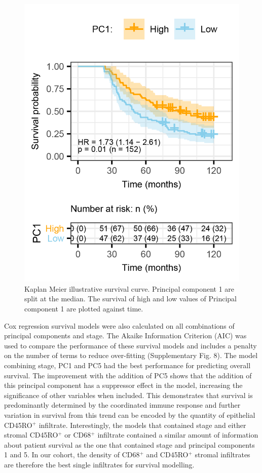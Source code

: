 \begin{figure}
    \centering
    \includegraphics{Chapter2/Figs/Raster/Montfort-2018_Fig7A-PC1.png}
    \caption[Kaplan Meier Curves for Principal Component 1]{Kaplan Meier illustrative survival curve. Principal component 1 are split at the median. The survival of high and low values of Principal component 1 are plotted against time. }
    \label{fig:km_PC}
\end{figure}
Cox regression survival models were also calculated on all combinations of principal components and stage. The Akaike Information Criterion (AIC) was used to compare the performance of these survival models and includes a penalty on the number of terms to reduce over-fitting (Supplementary Fig. 8). The model combining stage, PC1 and PC5 had the best performance for predicting overall survival. The improvement with the addition of PC5 shows that the addition of this principal component has a suppressor effect in the model, increasing the significance of other variables when included. This demonstrates that survival is predominantly determined by the coordinated immune response and further variation in survival from this trend can be encoded by the quantity of epithelial CD45RO$^+$ infiltrate. Interestingly, the models that contained stage and either stromal CD45RO$^+$ or CD68$^+$ infiltrate contained a similar amount of information about patient survival as the one that contained stage and principal components 1 and 5. In our cohort, the density of CD68$^+$ and CD45RO$^+$ stromal infiltrates are therefore the best single infiltrates for survival modelling. 


